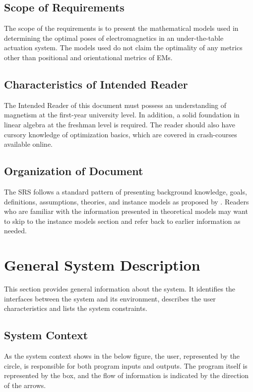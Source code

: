 \documentclass[12pt]{article}
\begin{document}
\subsection{Scope of Requirements} 
The scope of the requirements is to present the mathematical models used in determining the optimal poses of electromagnetics in an under-the-table actuation system. The models used do not claim the optimality of any metrics other than positional and orientational metrics of EMs.   


\subsection{Characteristics of Intended Reader} \label{sec_IntendedReader}
The Intended Reader of this document must possess an understanding of magnetism at the first-year university level. In addition, a solid foundation in linear algebra at the freshman level is required. The reader should also have cursory knowledge of optimization basics, which are covered in crash-courses available online.

\subsection{Organization of Document}
The SRS follows a standard pattern of presenting background knowledge, goals, definitions, assumptions, theories, and instance models as proposed by \citep{SmithAndLai2005,SmithEtAl2007,SmithAndKoothoor2016}. Readers who are familiar with the information presented in theoretical models may want to skip to the instance models section and refer back to earlier information as needed. 


\section{General System Description}

This section provides general information about the system.  It identifies the
interfaces between the system and its environment, describes the user
characteristics and lists the system constraints.

\subsection{System Context} \label{Sec_SysContext}
As the system context shows in the below figure, the user, represented by the circle, is responsible for both program inputs and outputs. The program itself is represented by the box, and the flow of information is indicated by the direction of the arrows. 
\end{document}
